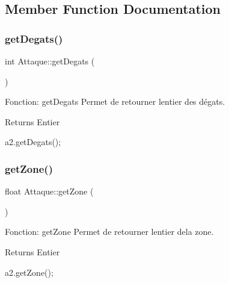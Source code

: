 \subsection{Member Function Documentation}
\mbox{\label{classAttaque_a56856e2880988e4cf9b051d32ca427a3}} 
\subsubsection{\texorpdfstring{get\+Degats()}{getDegats()}}
{\footnotesize\ttfamily int Attaque\+::get\+Degats (\begin{DoxyParamCaption}{ }\end{DoxyParamCaption})}



Fonction\+: get\+Degats Permet de retourner l\textquotesingle{}entier des dégats. 

\begin{DoxyReturn}{Returns}
Entier 
\begin{DoxyCode}
a2.getDegats();
\end{DoxyCode}
 
\end{DoxyReturn}
\mbox{\label{classAttaque_a84b1813598ac33dfcb76652d7ad4ebd4}} 
\subsubsection{\texorpdfstring{get\+Zone()}{getZone()}}
{\footnotesize\ttfamily float Attaque\+::get\+Zone (\begin{DoxyParamCaption}{ }\end{DoxyParamCaption})}



Fonction\+: get\+Zone Permet de retourner l\textquotesingle{}entier dela zone. 

\begin{DoxyReturn}{Returns}
Entier 
\begin{DoxyCode}
a2.getZone();
\end{DoxyCode}
 
\end{DoxyReturn}
\mbox{\label{classAttaque_ad1af4e5ae848c40c7879fa4f9a56c674}} 
